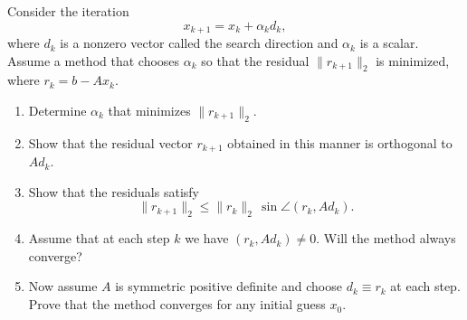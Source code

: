 \documentclass{ctexart}
\begin{document}
\begin{problem}
Consider the iteration
\[
x_{k+1} = x_k + \alpha_k d_k,
\]
where \(d_k\) is a nonzero vector called the search direction and \(\alpha_k\) is a scalar.  
Assume a method that chooses \(\alpha_k\) so that the residual \(\lVert r_{k+1} \rVert_2\) is minimized, where \(r_k=b-Ax_k\).

\begin{enumerate}[label=(\alph*)]
  \item Determine \(\alpha_k\) that minimizes \(\lVert r_{k+1} \rVert_2\).
  
  \item Show that the residual vector \(r_{k+1}\) obtained in this manner is orthogonal to \(A d_k\).
  
  \item Show that the residuals satisfy
  \[
    \lVert r_{k+1} \rVert_2 \le \lVert r_k \rVert_2 \,\sin\angle(r_k, A d_k).
  \]
  
  \item Assume that at each step \(k\) we have \((r_k, A d_k)\neq 0\). Will the method always converge?
  
  \item Now assume \(A\) is symmetric positive definite and choose \(d_k \equiv r_k\) at each step. Prove that the method converges for any initial guess \(x_0\).
\end{enumerate}
\end{problem}
\end{document}
